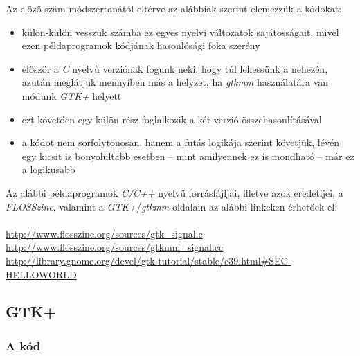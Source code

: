 Az előző szám módszertanától eltérve az alábbiak szerint elemezzük a kódokat:

\begin{itemize}
 \item külön-külön vesszük számba ez egyes nyelvi változatok sajátosságait, mivel ezen példaprogramok kódjának hasonlósági foka szerény
 \item először a \textit{C} nyelvű verziónak fogunk neki, hogy túl lehessünk a nehezén, azután meglátjuk mennyiben más a helyzet, ha \textit{gtkmm} használatára van módunk \textit{GTK+} helyett
 \item ezt követően egy külön rész foglalkozik a két verzió összehasonlításával
 \item a kódot nem sorfolytonosan, hanem a futás logikája szerint követjük, lévén egy kicsit is bonyolultabb esetben -- mint amilyennek ez is mondható -- már ez a logikusabb
\end{itemize}

Az alábbi példaprogramok \textit{C/C++} nyelvű forrásfájljai, illetve azok eredetijei, a \textit{FLOSSzine}, valamint a \textit{GTK+}/\textit{gtkmm} oldalain az alábbi linkeken érhetőek el:
\ \\\\
\url{http://www.flosszine.org/sources/gtk_signal.c}\\
\url{http://www.flosszine.org/sources/gtkmm_signal.cc}\\
\url{http://library.gnome.org/devel/gtk-tutorial/stable/c39.html#SEC-HELLOWORLD}\\

\subsection{GTK+}

\subsubsection{A kód}

